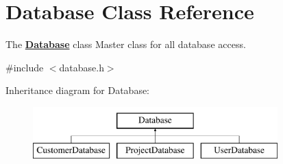 \hypertarget{classDatabase}{\section{Database Class Reference}
\label{classDatabase}
}


The {\bfseries \hyperlink{classDatabase}{Database}} class Master class for all database access.  




{\ttfamily \#include $<$database.\+h$>$}

Inheritance diagram for Database\+:\begin{figure}[H]
\begin{center}
\leavevmode
\includegraphics[height=2.000000cm]{de/d03/classDatabase}
\end{center}
\end{figure}
